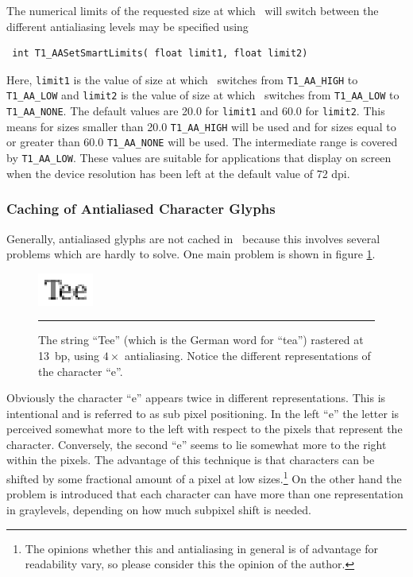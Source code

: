 The numerical limits of the requested size at which \tonelib\ will switch
between the different antialiasing levels may be specified using 
\precorr
\begin{verbatim}
 int T1_AASetSmartLimits( float limit1, float limit2)
\end{verbatim}\postcorr
Here, \verb+limit1+ is the value of size at which \tonelib\ switches from
\verb+T1_AA_HIGH+ to \verb+T1_AA_LOW+ and \verb+limit2+ is the value of size
at which \tonelib\ switches from \verb+T1_AA_LOW+ to \verb+T1_AA_NONE+. The
default values are 20.0 for \verb+limit1+ and 60.0 for \verb+limit2+. This
means for sizes smaller than 20.0 \verb+T1_AA_HIGH+ will be used and for sizes
equal to or greater than 60.0 \verb+T1_AA_NONE+ will be used. The intermediate
range is covered by \verb+T1_AA_LOW+. These values are suitable for
applications that display on screen when the device resolution has been left
at the default value of 72 dpi.


\subsubsection{Caching of Antialiased Character Glyphs} 
\label{aacaching}%
Generally, antialiased glyphs are not cached in \tonelib\ because this
involves several problems which are hardly to solve. One main problem is shown
in figure \ref{figure:subpixelpositioning}.
\begin{figure}
\centerline{\includegraphics[scale=10]{Tee.eps}}\relax
\vskip3mm
\hrule\vskip3mm\small
\caption{\label{figure:subpixelpositioning} The string ``Tee'' (which is the
  German word for ``tea'') rastered at 13~bp, using $4\times$ antialiasing.
  Notice the different representations of the character ``e''.} 
\end{figure}
Obviously the character ``e'' appears twice in different representations. This
is intentional and is referred to as sub pixel positioning. In the left ``e''
the letter is perceived somewhat more to the left with respect to the pixels
that represent the character. Conversely, the second ``e'' seems to lie
somewhat more to the right within the pixels. The advantage of this technique 
is that characters can be shifted by some fractional amount of a pixel at low
sizes.\footnote{The opinions whether this and antialiasing in general is of
  advantage for readability vary, so please consider this the opinion of the
  author. } On the other hand the problem is introduced that each character
can have more than one representation in graylevels, depending on how much
subpixel shift is needed. 

